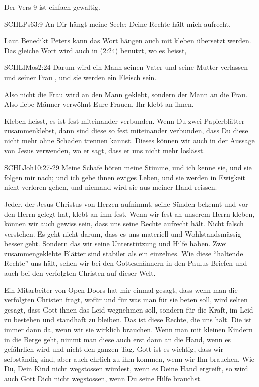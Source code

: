 \documentclass[fontsize=16pt]{mybib}
\begin{document}
    \begin{otsblock}
        Der Vers 9 ist einfach gewaltig.
        \begin{bibelbox}{SCHL}{Ps}{63:9}
            An Dir hängt meine Seele; Deine Rechte hält mich aufrecht.
        \end{bibelbox}
        Laut Benedikt Peters kann das Wort {hängen} auch mit {kleben} übersetzt werden. Das gleiche Wort wird auch in (2:24) benutzt, wo es heisst, 
        \begin{bibelbox}{SCHL}{IMos}{2:24}
            Darum wird ein Mann seinen Vater und seine Mutter verlassen und seiner Frau , und sie werden ein Fleisch sein.
        \end{bibelbox}
        Also nicht die Frau wird an den Mann geklebt, sondern der Mann an die Frau. Also liebe Männer verwöhnt Eure Frauen, Ihr klebt an ihnen.

        Kleben heisst, es ist fest miteinander verbunden. Wenn Du zwei Papierblätter zusammenklebst, dann sind diese so fest miteinander verbunden, dass Du diese nicht mehr ohne Schaden trennen kannst. Dieses  können wir auch in der Aussage von Jesus verwenden, wo er sagt, dass er uns nicht mehr loslässt. 
        \begin{bibelbox}{SCHL}{Joh}{10:27-29}
            Meine Schafe hören meine Stimme, und ich kenne sie, und sie folgen mir nach; und ich gebe ihnen ewiges Leben, und sie werden in Ewigkeit nicht verloren gehen, und niemand wird sie aus meiner Hand reissen.
        \end{bibelbox}
        Jeder, der Jesus Christus von Herzen aufnimmt, seine Sünden bekennt und vor den Herrn gelegt hat, klebt an ihm fest. Wenn wir fest an unserem Herrn kleben, können wir auch gewiss sein, dass uns seine Rechte aufrecht hält. Nicht falsch verstehen. Es geht nicht darum, dass es uns materiell und Wohlstandsmässig besser geht. Sondern das wir seine Unterstützung und Hilfe haben. Zwei zusammengeklebte Blätter sind stabiler als ein einzelnes. Wie diese \enquote[p,b]{haltende Rechte} uns hält, sehen wir bei den Gottesmännern in den Paulus Briefen und auch bei den verfolgten Christen auf dieser Welt. 
        
        Ein Mitarbeiter von Open Doors hat mir einmal gesagt, dass wenn man die verfolgten Christen fragt, wofür und für was man für sie beten soll, wird selten gesagt, dass Gott ihnen das Leid wegnehmen soll, sondern für die Kraft, im Leid zu bestehen und standhaft zu bleiben. Das ist diese Rechte, die uns hält. Die ist immer dann da, wenn wir sie wirklich brauchen. Wenn man mit kleinen Kindern in die Berge geht, nimmt man diese auch erst dann an die Hand, wenn es gefährlich wird und nicht den ganzen Tag. Gott ist es wichtig, dass wir selbständig sind, aber auch ehrlich zu ihm kommen, wenn wir Ihn brauchen. Wie Du, Dein Kind nicht wegstossen würdest, wenn es Deine Hand ergreift, so wird auch Gott Dich nicht wegstossen, wenn Du seine Hilfe brauchst.
    \end{otsblock}
\end{document}
